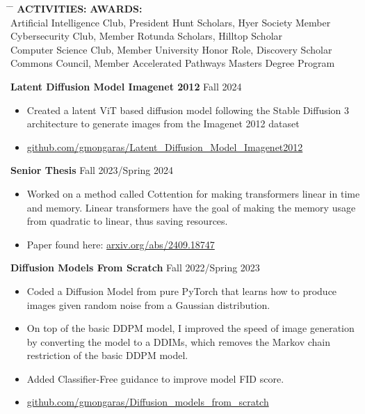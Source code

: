 \documentclass[a4paper,10pt]{article}
\begin{document}
\begin{tabbing}
\hspace{4in} \= \hspace{2in} \= \kill
\textbf{ACTIVITIES:} \> \textbf{AWARDS:} \\
Artificial Intelligence Club, President \> Hunt Scholars, Hyer Society Member \\
Cybersecurity Club, Member \> Rotunda Scholars, Hilltop Scholar  \\
Computer Science Club, Member \> University Honor Role, Discovery Scholar \\
Commons Council, Member \> Accelerated Pathways Masters Degree Program \\
\end{tabbing}




\vspace{0pt}
 \vspace{1pt}

\noindent\textbf{Latent Diffusion Model Imagenet 2012} \hfill Fall 2024
\begin{itemize}[noitemsep,topsep=0pt]
  \item Created a latent ViT based diffusion model following the Stable Diffusion 3 architecture to generate images from the Imagenet 2012 dataset
  \item \href{https://github.com/gmongaras/Latent_Diffusion_Model_Imagenet2012}{github.com/gmongaras/Latent\_Diffusion\_Model\_Imagenet2012}
\end{itemize}

\noindent\textbf{Senior Thesis} \hfill Fall 2023/Spring 2024
\begin{itemize}[noitemsep,topsep=0pt]
  \item Worked on a method called Cottention for making transformers linear in time and memory. Linear transformers have the goal of making the memory usage from quadratic to linear, thus saving resources.
  \item Paper found here: \href{https://arxiv.org/abs/2409.18747}{arxiv.org/abs/2409.18747}
\end{itemize}

\noindent\textbf{Diffusion Models From Scratch} \hfill Fall 2022/Spring 2023
\begin{itemize}[noitemsep,topsep=0pt]
  \item Coded a Diffusion Model from pure PyTorch that learns how to produce images given random noise from a Gaussian distribution.
  \item On top of the basic DDPM model, I improved the speed of image generation by converting the model to a DDIMs, which removes the Markov chain restriction of the basic DDPM model.
  \item Added Classifier-Free guidance to improve model FID score.
  \item \href{https://github.com/gmongaras/Diffusion_models_from_scratch}{github.com/gmongaras/Diffusion\_models\_from\_scratch}
\end{itemize}
\end{document}
